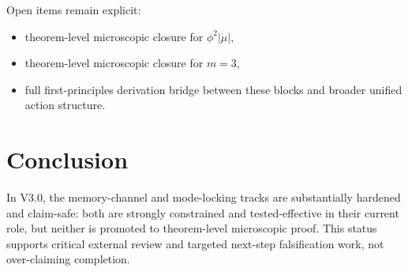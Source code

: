 \documentclass[11pt,a4paper]{article}
\begin{document}
Open items remain explicit:
\begin{itemize}
  \item theorem-level microscopic closure for \(\phi^2\lvert\dot{\mu}\rvert\),
  \item theorem-level microscopic closure for \(m=3\),
  \item full first-principles derivation bridge between these blocks and broader unified action structure.
\end{itemize}

\section{Conclusion}

In V3.0, the memory-channel and mode-locking tracks are substantially hardened and claim-safe: both are strongly constrained and tested-effective in their current role, but neither is promoted to theorem-level microscopic proof. This status supports critical external review and targeted next-step falsification work, not over-claiming completion.



\end{document}
